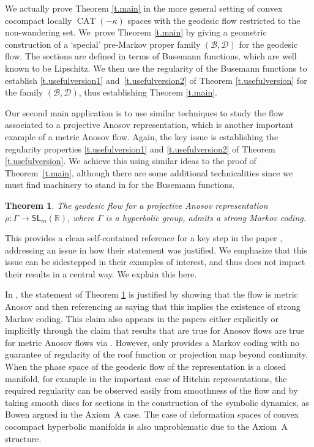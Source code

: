 \documentclass[JEP,XML,SOM,Unicode,NoFloatCountersInSection]{cedram}
\let\mathcal\mathscr
\newtheorem{thmx}{Theorem}
\theoremstyle{definition}
\numberwithin{equation}{section}
\DeclareMathOperator{\CAT}{CAT}
\newcommand\DDD{\mathcal D}
\newcommand\BBB{\mathcal B}
\begin{document}
We actually prove Theorem \ref{t.main} in the more general setting of convex cocompact locally $\CAT(-\kappa)$ spaces with the geodesic flow restricted to the non-wandering set. We~prove Theorem \ref{t.main} by giving a geometric construction of a `special' pre-Markov proper family $(\BBB, \DDD)$ for the geodesic flow. The sections are defined in terms of Busemann functions, which are well known to be Lipschitz. We then use the regularity of the Busemann functions to establish \eqref{t.usefulversion1} and~\eqref{t.usefulversion2} of Theorem \ref{t.usefulversion} for the family $(\BBB, \DDD)$, thus establishing Theorem \ref{t.main}.

Our second main application is to use similar techniques to study the flow associated to a projective Anosov representation, which is another important example of a metric Anosov flow. Again, the key issue is establishing the regularity properties \eqref{t.usefulversion1} and \eqref{t.usefulversion2} of Theorem \ref{t.usefulversion}. We achieve this using similar ideas to the proof of Theorem~\ref{t.main}, although there are some additional technicalities since we must find machinery to stand in for the Busemann functions.

\begin{thmx} \label{t.main2}
The geodesic flow for a projective Anosov representation $\rho: \Gamma \to \mathsf{SL}_m(\mathbb{R})$, where $\Gamma$ is a hyperbolic group, admits a strong Markov coding.
\end{thmx}

This provides a clean self-contained reference for a key step in the paper \cite{bcls}, addressing an issue in how their statement was justified. We emphasize that this issue can be sidestepped in their examples of interest, and thus does not impact their results in a central way. We explain this here.

In \cite{bcls}, the statement of Theorem \ref{t.main2} is justified by showing that the flow is metric Anosov \cite[Prop.\,5.1]{bcls} and then referencing \cite{pollicott} as saying that this implies the existence of strong Markov coding. This claim also appears in the papers \cite{BC17, BCLS18, PS17, aS16} either explicitly or implicitly through the claim that results that are true for Anosov flows are true for metric Anosov flows via \cite{pollicott}. However, \cite[Th.\,1]{pollicott} only provides a Markov coding with no guarantee of regularity of the roof function or projection map beyond continuity. When the phase space of the geodesic flow of the representation is a closed manifold, for example in the important case of Hitchin representations, the required regularity can be observed easily from smoothness of the flow and by taking smooth discs for sections in the construction of the symbolic dynamics, as Bowen argued in the Axiom~A case. The case of deformation spaces of convex cocompact hyperbolic manifolds is also unproblematic due to the Axiom~A structure.
\end{document}
